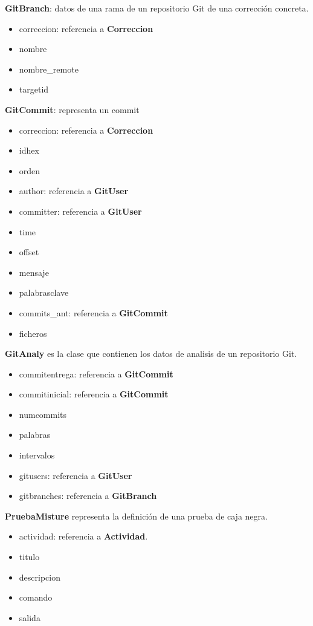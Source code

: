 \textbf{GitBranch}: datos de una rama de un repositorio Git de una corrección concreta.
\begin{itemize}
\item correccion: referencia a \textbf{Correccion}
\item nombre
\item nombre\_remote
\item targetid
\end{itemize}


\textbf{GitCommit}: representa un commit
\begin{itemize}
\item correccion: referencia a \textbf{Correccion}
\item idhex
\item orden
\item author: referencia a \textbf{GitUser}
\item committer: referencia a \textbf{GitUser}
\item time
\item offset
\item mensaje
\item palabrasclave
\item commits\_ant: referencia a \textbf{GitCommit}
\item ficheros
\end{itemize}


\textbf{GitAnaly} es la clase que contienen los datos de analisis de un repositorio Git.
\begin{itemize}
\item commitentrega: referencia a \textbf{GitCommit}
\item commitinicial: referencia a \textbf{GitCommit}
\item numcommits
\item palabras
\item intervalos
\item gitusers: referencia a \textbf{GitUser}
\item gitbranches: referencia a \textbf{GitBranch}
\end{itemize}


\textbf{PruebaMisture} representa la definición de una prueba de caja negra.
\begin{itemize}
\item actividad: referencia a \textbf{Actividad}.
\item titulo
\item descripcion
\item comando
\item salida
\end{itemize}


